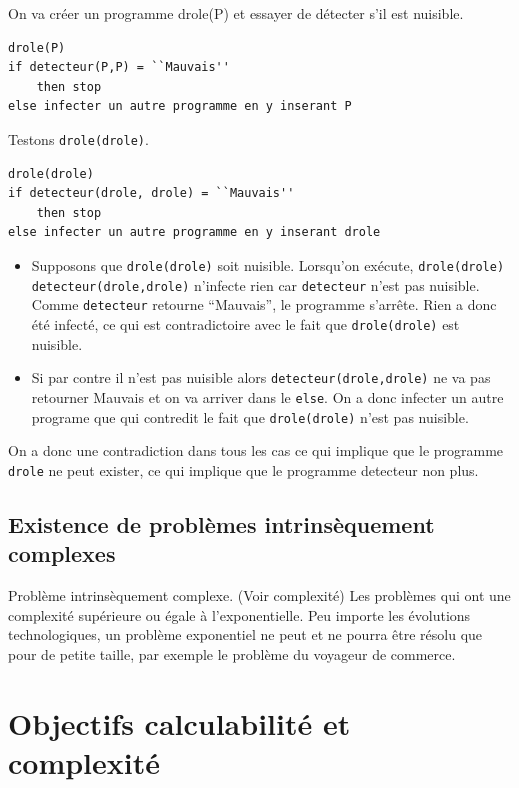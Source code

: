 On va créer un programme drole(P) et essayer de détecter s’il est nuisible.

\begin{lstlisting}
drole(P)
if detecteur(P,P) = ``Mauvais''
	then stop
else infecter un autre programme en y inserant P
\end{lstlisting}

Testons \lstinline|drole(drole)|.
\begin{lstlisting}
drole(drole)
if detecteur(drole, drole) = ``Mauvais''
	then stop
else infecter un autre programme en y inserant drole
\end{lstlisting}

\begin{itemize}
	\item Supposons que \lstinline|drole(drole)| soit nuisible.
      Lorsqu'on exécute, \lstinline|drole(drole)|
      \lstinline|detecteur(drole,drole)| n'infecte rien car \lstinline|detecteur| n'est pas nuisible.
      Comme \lstinline|detecteur| retourne ``Mauvais'',
      le programme s'arrête.
      Rien a donc été infecté, ce qui est contradictoire avec le fait que \lstinline|drole(drole)| est nuisible.
	\item Si par contre il n'est pas nuisible alors \lstinline|detecteur(drole,drole)|
      ne va pas retourner Mauvais et on va arriver dans le \lstinline|else|.
      On a donc infecter un autre programe que qui contredit le fait que \lstinline|drole(drole)| n'est pas nuisible.
\end{itemize}

On a donc une contradiction dans tous les cas ce qui implique que le programme \lstinline|drole| ne peut
exister, ce qui implique que le programme detecteur non plus.

\subsection{ Existence de problèmes intrinsèquement complexes}
	Problème intrinsèquement complexe. (Voir complexité) Les problèmes
		qui ont une complexité supérieure ou égale à l'exponentielle. Peu importe les évolutions technologiques, un problème exponentiel ne peut et ne pourra être résolu que pour de petite taille, par exemple le problème du voyageur de commerce. 
		
\section{Objectifs calculabilité et complexité}

